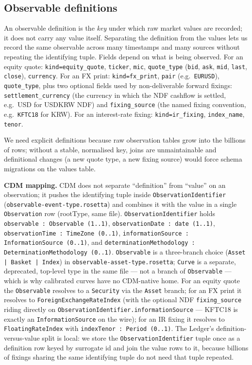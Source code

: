 \documentclass[11pt,a4paper]{article}
\begin{document}
\subsection{Observable definitions}

An observable definition is the \emph{key} under which raw market values are recorded; it does not carry any value itself. Separating the definition from the values lets us record the same observable across many timestamps and many sources without repeating the identifying tuple. Fields depend on what is being observed. For an equity quote: \texttt{kind=equity\_quote}, \texttt{ticker}, \texttt{mic}, \texttt{quote\_type} (\texttt{bid}, \texttt{ask}, \texttt{mid}, \texttt{last}, \texttt{close}), \texttt{currency}. For an FX print: \texttt{kind=fx\_print}, \texttt{pair} (e.g.\ \texttt{EURUSD}), \texttt{quote\_type}, plus two optional fields used by non-deliverable forward fixings: \texttt{settlement\_currency} (the currency in which the NDF cashflow is settled, e.g.\ USD for USDKRW NDF) and \texttt{fixing\_source} (the named fixing convention, e.g.\ \texttt{KFTC18} for KRW). For an interest-rate fixing: \texttt{kind=ir\_fixing}, \texttt{index\_name}, \texttt{tenor}.

We need explicit definitions because raw observation tables grow into the billions of rows; without a stable, normalised key, joins are unmaintainable and definitional changes (a new quote type, a new fixing source) would force schema migrations on the values table.

\textbf{CDM mapping.} CDM does not separate ``definition'' from ``value'' on an observation; it pushes the identifying tuple inside \texttt{ObservationIdentifier} (\texttt{observable-event-type.rosetta}) and combines it with the value in a single \texttt{Observation} row (rootType, same file). \texttt{ObservationIdentifier} holds \texttt{observable : Observable (1..1)}, \texttt{observationDate : date (1..1)}, \texttt{observationTime : TimeZone (0..1)}, \texttt{informationSource : InformationSource (0..1)}, and \texttt{determinationMethodology : DeterminationMethodology (0..1)}. \texttt{Observable} is a three-branch choice (\texttt{Asset | Basket | Index}) in \texttt{observable-asset-type.rosetta}; \texttt{Curve} is a separate, deprecated, top-level type in the same file --- not a branch of \texttt{Observable} --- which is why calibrated curves have no CDM-native home. For an equity quote the \texttt{Observable} resolves to a \texttt{Security} via the \texttt{Asset} branch; for an FX print it resolves to \texttt{ForeignExchangeRateIndex} (with the optional NDF \texttt{fixing\_source} riding directly on \texttt{ObservationIdentifier.informationSource} --- KFTC18 is exactly an \texttt{InformationSource} on the wire); for an IR fixing it resolves to \texttt{FloatingRateIndex} with \texttt{indexTenor : Period (0..1)}. The Ledger's definition-versus-value split is local: we store the \texttt{ObservationIdentifier} tuple once as a definition row keyed by surrogate id and join the value rows to it, because billions of fixings sharing the same identifying tuple do not need that tuple repeated.
\end{document}

